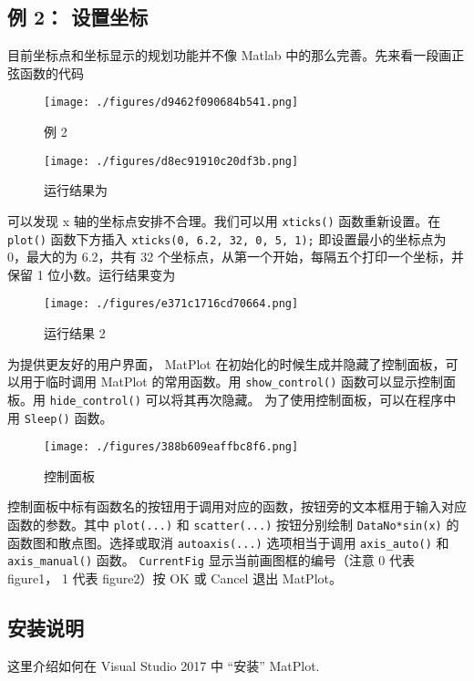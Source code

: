 \subsection{例 2： 设置坐标}

目前坐标点和坐标显示的规划功能并不像 Matlab 中的那么完善。先来看一段画正弦函数的代码

\begin{figure}[ht]
\centering
\texttt{[image: ./figures/d9462f090684b541.png]}
\caption{例 2} \label{fig_MtPlot_5}
\end{figure}

\begin{figure}[ht]
\centering
\texttt{[image: ./figures/d8ec91910c20df3b.png]}
\caption{运行结果为} \label{fig_MtPlot_6}
\end{figure}

可以发现 x 轴的坐标点安排不合理。我们可以用 \verb|xticks()| 函数重新设置。在 \verb|plot()| 函数下方插入
\verb|xticks(0, 6.2, 32, 0, 5, 1);|
即设置最小的坐标点为 0，最大的为 6.2，共有 32 个坐标点，从第一个开始，每隔五个打印一个坐标，并保留 1 位小数。运行结果变为

\begin{figure}[ht]
\centering
\texttt{[image: ./figures/e371c1716cd70664.png]}
\caption{运行结果 2} \label{fig_MtPlot_7}
\end{figure}

为提供更友好的用户界面， MatPlot 在初始化的时候生成并隐藏了控制面板，可以用于临时调用 MatPlot 的常用函数。用 \verb|show_control()| 函数可以显示控制面板。用 \verb|hide_control()| 可以将其再次隐藏。 为了使用控制面板，可以在程序中用 \verb|Sleep()| 函数。

\begin{figure}[ht]
\centering
\texttt{[image: ./figures/388b609eaffbc8f6.png]}
\caption{控制面板} \label{fig_MtPlot_8}
\end{figure}

控制面板中标有函数名的按钮用于调用对应的函数，按钮旁的文本框用于输入对应函数的参数。其中 \verb|plot(...)| 和 \verb|scatter(...)| 按钮分别绘制 \verb|DataNo*sin(x)| 的函数图和散点图。选择或取消 \verb|autoaxis(...)| 选项相当于调用 \verb|axis_auto()| 和 \verb|axis_manual()| 函数。 \verb|CurrentFig| 显示当前画图框的编号（注意 0 代表 figure1， 1 代表 figure2）按 OK 或 Cancel 退出 MatPlot。


\subsection{安装说明}
这里介绍如何在 Visual Studio 2017 中 “安装” MatPlot. 

